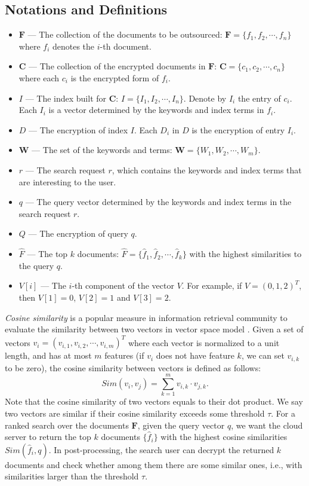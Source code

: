 \documentclass{article}
\begin{document}
\subsection{Notations and Definitions}
\label{sec:prelim}
\begin{itemize}
\item $\mathbf{F}$ \---- The collection of the documents to be outsourced: $\mathbf{F} = \{f_1, f_2, \cdots, f_n\}$ where $f_i$ denotes the $i$-th document.
\item $\mathbf{C}$ \---- The collection of the encrypted documents in $\mathbf{F}$: $\mathbf{C} = \{c_1, c_2, \cdots, c_n\}$ where each $c_i$ is the encrypted form of $f_i$.
\item $I$ \---- The index built for $\mathbf{C}$: $I = \{I_1, I_2, \cdots, I_n\}$. Denote by $I_i$ the entry of $c_i$. Each $I_i$ is a vector determined by the keywords and index terms in $f_i$.
\item $D$ \---- The encryption of index $I$. Each $D_i$ in $D$ is the encryption of entry $I_i$.
\item $\mathbf{W}$ \---- The set of the keywords and terms: $\mathbf{W} = \{W_1, W_2, \cdots, W_m\}$.
\item $r$ \---- The search request $r$, which contains the keywords and index terms that are interesting to the user.
\item $q$ \---- The query vector determined by the keywords and index terms in the search request $r$.
\item $Q$ \---- The encryption of query $q$.
\item $\hat{F}$ \---- The top $k$ documents: $\hat{F} = \{\hat{f}_1, \hat{f}_2, \cdots, \hat{f}_k\}$ with the highest similarities to the query $q$.
\item $V[i]$ \---- The $i$-th component of the vector $V$. For example, if $V = (0,1,2)^T$, then $V[1] = 0$, $V[2] = 1$ and $V[3] = 2$.
\end{itemize}

\emph{Cosine similarity} is a popular measure in information retrieval community to evaluate the similarity between two vectors in vector space model \cite{Sun13,ATY13,TAJY14}. Given a set of vectors $v_i = (v_{i,1}, v_{i,2}, \cdots, v_{i,m})^T$ where each vector is normalized to a unit length, and has at most $m$ features (if $v_i$ does not have feature $k$, we can set $v_{i,k}$ to be zero), the cosine similarity between vectors is defined as follows:
$$Sim(v_i,v_j) = \sum_{k=1}^m v_{i,k}\cdot v_{j,k}.$$
Note that the cosine similarity of two vectors equals to their dot product. We say two vectors are similar if their cosine similarity exceeds some threshold $\tau$. For a ranked search over the documents $\mathbf{F}$, given the query vector $q$, we want the cloud server to return the top $k$ documents $\{\hat{f}_i\}$ with the highest cosine similarities $Sim(\hat{f}_i, q)$. In post-processing, the search user can decrypt the returned $k$ documents and check whether among them there are some similar ones, i.e., with similarities larger than the threshold $\tau$.
\end{document}
